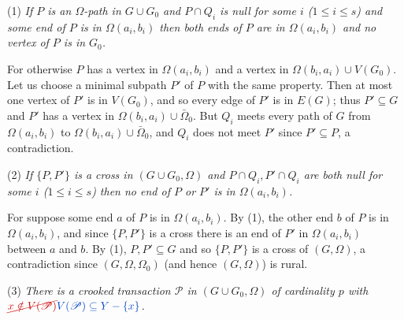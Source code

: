 \hspace*{12pt}(1) \textit{If $P$ is an $\Omega$-path in $G \cup G_0$ and $P \cap Q_i$ is null for some $i$ ($1 \le i \le s$) and some end of $P$ is in $\Omega(a_i, b_i)$ then both ends of $P$ are in $\Omega(a_i, b_i)$ and no vertex of $P$ is in $G_0$.}

For otherwise $P$ has a vertex in $\Omega(a_i, b_i)$ and a vertex in $\Omega(b_i, a_i) \cup V(G_0)$. Let us choose a minimal subpath $P'$ of $P$ with the same property. Then at most one vertex of $P'$ is in $V(G_0)$, and so every edge of $P'$ is in $E(G)$; thus $P' \subseteq G$ and $P'$ has a vertex in $\Omega(b_i, a_i) \cup \bar{\Omega}_0$. But $Q_i$ meets every path of $G$ from $\Omega(a_i, b_i)$ to $\Omega(b_i, a_i) \cup \bar{\Omega}_0$, and $Q_i$ does not meet $P'$ since $P' \subseteq P$, a contradiction.

\hspace*{12pt}(2) \textit{If $\{P, P'\}$ is a cross in $(G \cup G_0, \Omega)$ and $P \cap Q_i, P' \cap Q_i$ are both null for some $i$ ($1 \le i \le s$) then no end of $P$ or $P'$ is in $\Omega(a_i, b_i)$.}

For suppose some end $a$ of $P$ is in $\Omega(a_i, b_i)$. By (1), the other end $b$ of $P$ is in $\Omega(a_i, b_i)$, and since $\{P, P'\}$ is a cross there is an end of $P'$ in $\Omega(a_i, b_i)$ between $a$ and $b$. By (1), $P, P' \subseteq G$ and so $\{P, P'\}$ is a cross of $(G, \Omega)$, a contradiction since $(G, \Omega, \Omega_0)$ (and hence $(G, \Omega)$) is rural.

\hspace*{12pt}(3) \textit{There is a crooked transaction $\mathscr{P}$ in $(G \cup G_0, \Omega)$ of cardinality $p$ with $\delm{x \notin V(\mathscr{P})}\fix{V(\mathscr{P}) \subseteq Y - \{x\}}$.}

